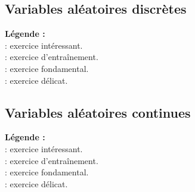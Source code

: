 \subsection{Variables al\'eatoires discr\`etes}






\newpage




{\noindent
{\bf L\'egende :}\\

\noindent \coolexo : exercice int\'eressant.\\
\boringexo : exercice d'entra\^inement.\\
\minsyndical : exercice fondamental.\\
\mortelexo : exercice d\'elicat.}

\newpage

\subsection{Variables al\'eatoires continues}






{\noindent
{\bf L\'egende :}\\

\noindent \coolexo : exercice int\'eressant.\\
\boringexo : exercice d'entra\^inement.\\
\minsyndical : exercice fondamental.\\
\mortelexo : exercice d\'elicat.}



